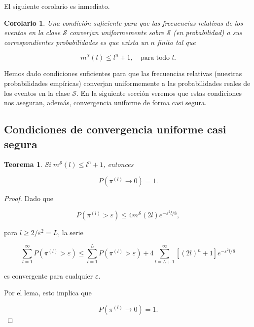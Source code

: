 \documentclass{report}
\newtheorem{thm}{Teorema}[subsection]
\newtheorem{cor}{Corolario}[thm]
\begin{document}
El siguiente corolario es inmediato.\newline

\begin{cor}
Una condición suficiente para que las frecuencias relativas de los eventos en la clase \( \mathcal{S} \) converjan uniformemente sobre \( \mathcal{S} \) (en probabilidad) a sus correspondientes probabilidades es que exista un \( n \) finito tal que  

\[
m^{\mathcal{S}}(l) \leq l^n + 1, \quad \text{para todo } l.
\]
\end{cor}

\bigskip
Hemos dado condiciones suficientes para que las frecuencias relativas (nuestras probabilidades empíricas) converjan uniformemente a las 
probabilidades reales de los eventos en la clase \( \mathcal{S} \). En la siguiente sección veremos que estas condiciones nos aseguran, además, 
convergencia uniforme de forma casi segura.\newline

\subsection{Condiciones de convergencia uniforme casi segura}

\begin{thm}
    Si \( m^{\mathcal{S}}(l) \leq l^n + 1 \), entonces  

    \[
    P(\pi^{(l)} \to 0) = 1.
    \]
    
\end{thm} 

\begin{proof}

Dado que  

\[
P(\pi^{(l)} > \varepsilon) \leq 4 m^{\mathcal{S}}(2l)  e^{-\varepsilon^2 l/8},
\]

para \( l \geq 2 / \varepsilon^2 =L \), la serie  

\[
\sum_{l=1}^{\infty} P(\pi^{(l)} > \varepsilon) \leq \sum_{l=1}^{L} P(\pi^{(l)} > \varepsilon) + 4 \sum_{l=L+1}^{\infty} [(2l)^n + 1] e^{-\varepsilon^2 l/8}
\]

es convergente para cualquier \( \varepsilon \).  

Por el lema, esto implica que  

\[
P(\pi^{(l)} \to 0) = 1.
\]
\end{proof}
\end{document}
